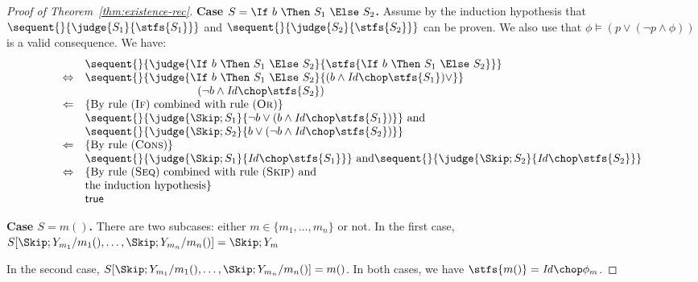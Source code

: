 \documentclass[a4paper,numberwithinsect]{lipics-v2021}
\begin{document}
\begin{proof}[Proof of Theorem~\ref{thm:existence-rec}]
  \noindent\textbf{Case $S = \If\ b\ \Then\ S_1\ \Else\ S_2$.}
  Assume by the induction hypothesis that
  $\sequent{}{\judge{S_1}{\stfs{S_1}}}$ and
  $\sequent{}{\judge{S_2}{\stfs{S_2}}}$ can be proven.
  We also use that $\phi\models(p\lor(\lnot p\land\phi))$ is a valid
  consequence.
  We have: %
  \[
    \begin{array}{rl}
      & 
        \sequent{}{\judge{\If\ b\ \Then\ S_1\ \Else\ S_2}
        {\stfs{\If\ b\ \Then\ S_1\ \Else\ S_2}}} \\
      \Leftrightarrow & 
                        \sequent{}{\judge{\If\ b\ \Then\ S_1\ \Else\ S_2}
                        {(b \land \mathit{Id} \chop \stfs{S_1})
                        \lor
                        }} \\
      & \qquad\qquad\qquad\qquad\qquad(\lnot b \land \mathit{Id} \chop \stfs{S_2})\\
      \Leftarrow &
                   \mbox{\{By rule (\textsc{If}) combined with rule (\textsc{Or})\}} \\
      &
        \sequent{}{\judge{\Skip; S_1}
        {\lnot b \lor (b \land \mathit{Id} \chop \stfs{S_1})}} 
        ~\mbox{and}\\
      &
        \sequent{}{\judge{\Skip; S_2}
        {b \lor (\lnot b \land \mathit{Id} \chop \stfs{S_2})}} \\  
      \Leftarrow &
                   \mbox{\{By rule (\textsc{Cons})\}} \\
      &
        \sequent{}{\judge{\Skip; S_1}
        {\mathit{Id} \chop \stfs{S_1}}} 
        ~\mbox{and}
        \sequent{}{\judge{\Skip; S_2}
        {\mathit{Id} \chop \stfs{S_2}}} \\  
      \Leftrightarrow &
                        \mbox{\{By rule (\textsc{Seq}) combined with rule (\textsc{Skip})
                        and}\\
      & \mbox{the induction hypothesis\}} \\
      &
        \mathsf{true} 
    \end{array}
  \]
  
  \noindent\textbf{Case $S = m()$.}
  There are two subcases: either $m\in\{m_1,\ldots,m_n\}$ or not.
  In the first case,
  $S[\Skip;Y_{m_1}/m_1(),\ldots,\Skip;Y_{m_n}/m_n()]=\Skip;Y_m$

  In the second case,
  $S[\Skip;Y_{m_1}/m_1(),\ldots,\Skip;Y_{m_n}/m_n()]=m()$.
  In both cases, we have 
  $\stfs{m()} = \mathit{Id} \chop \phi_m$.
  

\end{proof}
\end{document}
